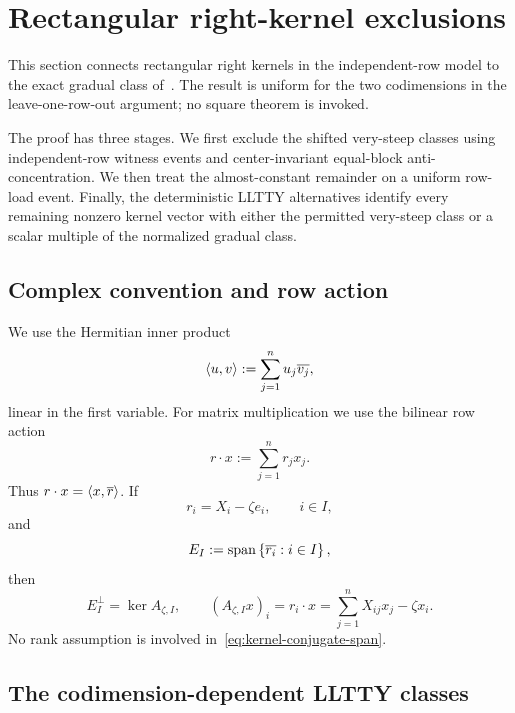 \section{Rectangular right-kernel exclusions}\label{sec:kernels}

This section connects rectangular right kernels in the independent-row model to the exact gradual class of~\cite{LLTTY19}. The result is uniform for the two codimensions in the leave-one-row-out argument; no square theorem is invoked.

The proof has three stages. We first exclude the shifted very-steep classes using independent-row witness events and center-invariant equal-block anti-concentration. We then treat the almost-constant remainder on a uniform row-load event. Finally, the deterministic LLTTY alternatives identify every remaining nonzero kernel vector with either the permitted very-steep class or a scalar multiple of the normalized gradual class.

\subsection{Complex convention and row action}

We use the Hermitian inner product
\[
  \left\langle u,v\right\rangle:=\sum_{j=1}^n u_j\overline{v_j},
\]
linear in the first variable. For matrix multiplication we use the bilinear row action
\[
  r\cdot x:=\sum_{j=1}^n r_jx_j.
\]
Thus $r\cdot x=\left\langle x,\overline r\right\rangle$. If
\[
  r_i=X_i-\zeta e_i,
  \qquad i\in I,
\]
and
\[
  E_I:=\operatorname{span}\left\{\overline{r_i}:i\in I\right\},
\]
then
\begin{equation}\label{eq:kernel-conjugate-span}
  E_I^\perp=\ker A_{\zeta,I},
  \qquad
  (A_{\zeta,I}x)_i=r_i\cdot x
  =\sum_{j=1}^nX_{ij}x_j-\zeta x_i.
\end{equation}
No rank assumption is involved in~\eqref{eq:kernel-conjugate-span}.

\subsection{The codimension-dependent LLTTY classes}\label{subsec:classes}

